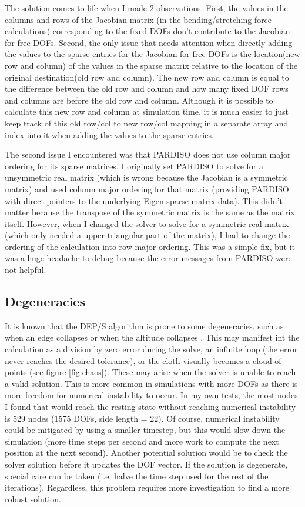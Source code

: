 \documentclass[letterpaper, 10 pt, conference]{ieeeconf}  %
\begin{document}
        The solution comes to life when I made 2 observations. First, the values in the columns and rows of the Jacobian matrix (in the bending/stretching force calculations) corresponding to the fixed DOFs don't contribute to the Jacobian for free DOFs. Second, the only issue that needs attention when directly adding the values to the sparse entries for the Jacobian for free DOFs is the location(new row and column) of the values in the sparse matrix relative to the location of the original destination(old row and column). The new row and column is equal to the difference between the old row and column and how many fixed DOF rows and columns are before the old row and column. Although it is possible to calculate this new row and column at simulation time, it is much easier to just keep track of this old row/col to new row/col mapping in a separate array and index into it when adding the values to the sparse entries. 
        
        The second issue I encountered was that PARDISO does not use column major ordering for its sparse matrices. I originally set PARDISO to solve for a unsymmetric real matrix (which is wrong because the Jacobian is a symmetric matrix) and used column major ordering for that matrix (providing PARDISO with direct pointers to the underlying Eigen sparse matrix data). This didn't matter because the transpose of the symmetric matrix is the same as the matrix itself. However, when I changed the solver to solve for a symmetric real matrix (which only needed a upper triangular part of the matrix), I had to change the ordering of the calculation into row major ordering. This was a simple fix, but it was a huge headache to debug because the error messages from PARDISO were not helpful.

\subsection{Degeneracies}
        It is known that the DEP/S algorithm is prone to some degeneracies, such as when an edge collapses or when the altitude collapses \cite{Tamstorf2013discrete}. This may manifest int the calculation as a division by zero error during the solve, an infinite loop (the error never reaches the desired tolerance), or the cloth visually becomes a cloud of points (see figure \ref{fig:chaos}). These may arise when the solver is unable to reach a valid solution. This is more common in simulations with more DOFs as there is more freedom for numerical instability to occur. In my own tests, the most nodes I found that would reach the resting state without reaching numerical instability is 529 nodes (1575 DOFs, side length = 22). Of course, numerical instability could be mitigated by using a smaller timestep, but this would slow down the simulation (more time steps per second and more work to compute the next position at the next second). Another potential solution would be to check the solver solution before it updates the DOF vector. If the solution is degenerate, special care can be taken (i.e. halve the time step used for the rest of the iterations). Regardless, this problem requires more investigation to find a more robust solution.
\end{document}
